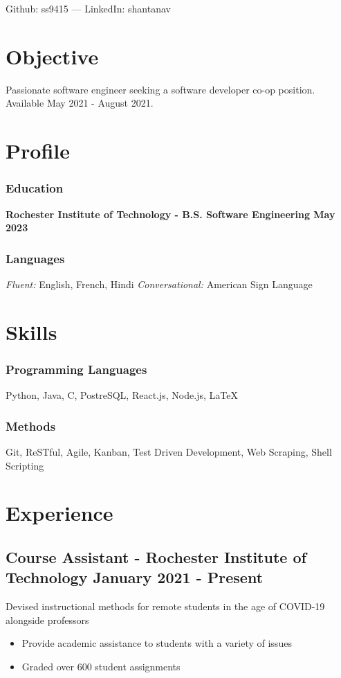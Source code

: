 \documentclass[11pt, letterpaper]{article}
\renewcommand{\maketitle} {
    \begin{center}    
        {\huge\bfseries \theauthor}

        \vspace{.5em}

        Github: ss9415 --- LinkedIn: shantanav
    \end{center}
    \thispagestyle{empty}
}
\begin{document}
    \author{Shantanav Saurav}

    \maketitle

    \section{Objective}
        Passionate software engineer seeking a software developer co-op position. 
        Available May 2021 - August 2021.

    \section{Profile}
        \subsubsection{Education}
            \textbf{Rochester Institute of Technology - B.S. Software Engineering \hfill May 2023}
        \subsubsection{Languages}
            \emph{Fluent:} English, French, Hindi 
            \emph{Conversational:} American Sign Language

    \section{Skills}
        \subsubsection{Programming Languages}
            Python, Java, C, PostreSQL, React.js, Node.js, \LaTeX
        \subsubsection{Methods}
            Git, ReSTful, Agile, Kanban, Test Driven Development, Web Scraping, Shell Scripting

    \section{Experience}
        \subsection{Course Assistant - Rochester Institute of Technology \hfill January 2021 - Present}
            Devised instructional methods for remote students in the age of COVID-19 alongside
            professors
            \begin{itemize}[nosep]
                \item Provide academic assistance to students with a variety of issues
                \item Graded over 600 student assignments
            \end{itemize}
\end{document}
